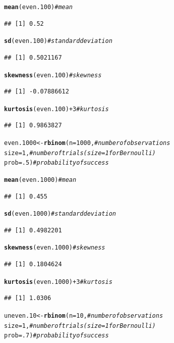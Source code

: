\documentclass{article}\usepackage[]{graphicx}\usepackage[]{color}
\makeatletter
\newcommand{\hlnum}[1]{\textcolor[rgb]{0.686,0.059,0.569}{#1}}%
\newcommand{\hlcom}[1]{\textcolor[rgb]{0.678,0.584,0.686}{\textit{#1}}}%
\newcommand{\hlopt}[1]{\textcolor[rgb]{0,0,0}{#1}}%
\newcommand{\hlstd}[1]{\textcolor[rgb]{0.345,0.345,0.345}{#1}}%
\newcommand{\hlkwb}[1]{\textcolor[rgb]{0.69,0.353,0.396}{#1}}%
\newcommand{\hlkwc}[1]{\textcolor[rgb]{0.333,0.667,0.333}{#1}}%
\newcommand{\hlkwd}[1]{\textcolor[rgb]{0.737,0.353,0.396}{\textbf{#1}}}%
\newenvironment{kframe}{%
 \def\at@end@of@kframe{}%
 \ifinner\ifhmode%
  \def\at@end@of@kframe{\end{minipage}}%
  \begin{minipage}{\columnwidth}%
 \fi\fi%
 \def\FrameCommand##1{\hskip\@totalleftmargin \hskip-\fboxsep
 \colorbox{shadecolor}{##1}\hskip-\fboxsep
     \hskip-\linewidth \hskip-\@totalleftmargin \hskip\columnwidth}%
 \MakeFramed {\advance\hsize-\width
   \@totalleftmargin\z@ \linewidth\hsize
   \@setminipage}}%
 {\par\unskip\endMakeFramed%
 \at@end@of@kframe}
\newenvironment{knitrout}{}{} %
\makeatother
\begin{document}
\begin{enumerate}
\begin{enumerate}
\begin{knitrout}
\begin{kframe}
\begin{alltt}
\hlkwd{mean}\hlstd{(even.100)}                   \hlcom{#mean}
\end{alltt}
\begin{verbatim}
## [1] 0.52
\end{verbatim}
\begin{alltt}
\hlkwd{sd}\hlstd{(even.100)}                     \hlcom{#standard deviation}
\end{alltt}
\begin{verbatim}
## [1] 0.5021167
\end{verbatim}
\begin{alltt}
\hlkwd{skewness}\hlstd{(even.100)}               \hlcom{#skewness}
\end{alltt}
\begin{verbatim}
## [1] -0.07886612
\end{verbatim}
\begin{alltt}
\hlkwd{kurtosis}\hlstd{(even.100)}\hlopt{+}\hlnum{3}             \hlcom{#kurtosis}
\end{alltt}
\begin{verbatim}
## [1] 0.9863827
\end{verbatim}
\begin{alltt}
\hlstd{even.1000} \hlkwb{<-} \hlkwd{rbinom}\hlstd{(}\hlkwc{n}\hlstd{=}\hlnum{1000}\hlstd{,}      \hlcom{#number of observations}
              \hlkwc{size}\hlstd{=}\hlnum{1}\hlstd{,}            \hlcom{#number of trials (size=1 for Bernoulli)}
              \hlkwc{prob}\hlstd{=}\hlnum{.5}\hlstd{)}           \hlcom{#probability of success}

\hlkwd{mean}\hlstd{(even.1000)}                  \hlcom{#mean}
\end{alltt}
\begin{verbatim}
## [1] 0.455
\end{verbatim}
\begin{alltt}
\hlkwd{sd}\hlstd{(even.1000)}                    \hlcom{#standard deviation}
\end{alltt}
\begin{verbatim}
## [1] 0.4982201
\end{verbatim}
\begin{alltt}
\hlkwd{skewness}\hlstd{(even.1000)}              \hlcom{#skewness}
\end{alltt}
\begin{verbatim}
## [1] 0.1804624
\end{verbatim}
\begin{alltt}
\hlkwd{kurtosis}\hlstd{(even.1000)}\hlopt{+}\hlnum{3}            \hlcom{#kurtosis}
\end{alltt}
\begin{verbatim}
## [1] 1.0306
\end{verbatim}
\begin{alltt}
\hlstd{uneven.10} \hlkwb{<-} \hlkwd{rbinom}\hlstd{(}\hlkwc{n}\hlstd{=}\hlnum{10}\hlstd{,}        \hlcom{#number of observations}
                  \hlkwc{size}\hlstd{=}\hlnum{1}\hlstd{,}        \hlcom{#number of trials (size=1 for Bernoulli)}
                  \hlkwc{prob}\hlstd{=}\hlnum{.7}\hlstd{)}       \hlcom{#probability of success}


\end{alltt}
\end{kframe}
\end{knitrout}
\end{enumerate}
\end{enumerate}
\end{document}
